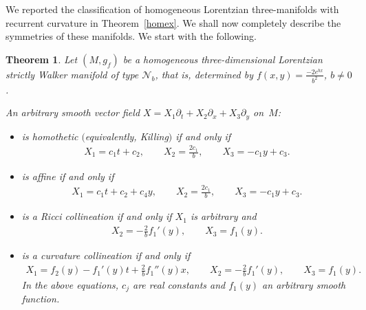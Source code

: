 \documentclass[10pt,a4paper]{amsart}
\numberwithin{equation}{section}
\newtheorem{Theorem}{Theorem}[section]
\begin{document}
We reported the classif\/ication of homogeneous Lorentzian three-manifolds with recurrent curvature in Theorem~\ref{homex}. We shall now completely describe the symmetries of these manifolds. We start with the following.

\begin{Theorem}
Let $(M,g_f)$ be a homogeneous three-dimensional Lorentzian strictly Walker mani\-fold of type $\mathcal N_b$, that is, determined by
$f(x,y)=\frac{-2e^{bx}}{b^2}$, $b\neq 0$.

An arbitrary smooth vector field $X=X_1\partial_t+X_2\partial_x+X_3\partial_y$ on~$M$:
\begin{itemize}\itemsep=0pt
\item is homothetic $($equivalently, Killing$)$ if and only if
\begin{gather*}X_1=c_1t+c_2, \qquad X_2=\frac{2c_1}{b}, \qquad X_3=-c_1y+c_3.\end{gather*}
\item is affine if and only if
\begin{gather*}X_1=c_1t+c_2+c_4y,\qquad X_2=\frac{2c_1}{b},\qquad X_3=-c_1y+c_3.\end{gather*}
\item is a Ricci collineation if and only if $X_1$ is arbitrary and
\begin{gather*} X_2=-\frac2b f_1 '(y),\qquad X_3=f_1(y).\end{gather*}
\item is a curvature collineation if and only if{\samepage
\begin{gather*}X_1=f_2(y)-f_1 '(y) t+\frac2bf_1 ''(y)x,\qquad X_2=-\frac 2bf_1 '(y),\qquad X_3=f_1(y).\end{gather*}
In the above equations, $c_j $ are real constants and $f_1(y)$ an arbitrary smooth function.}
\end{itemize}
\end{Theorem}
\end{document}
